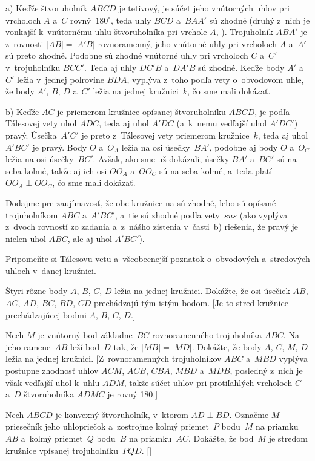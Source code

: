 {%
a)
Keďže štvoruholník $ABCD$ je tetivový, je súčet jeho vnútorných uhlov
pri vrcholoch $A$ a~$C$ rovný~$180^\circ$, teda uhly $BCD$ a~$BAA'$ sú zhodné
(druhý z~nich je vonkajší k~vnútornému uhlu štvoruholníka pri vrchole $A$, \obr).
Trojuholník $ABA'$ je z~rovnosti $|AB|=|A'B|$ rovnoramenný, jeho vnútorné
uhly pri vrcholoch $A$ a~$A'$ sú preto zhodné. Podobne sú zhodné vnútorné
uhly pri vrcholoch $C$ a~$C'$ v~trojuholníku $BCC'$. Teda aj uhly $DC'B$ a~$DA'B$
sú zhodné.
Keďže body $A'$ a~$C'$ ležia v~jednej polrovine $BDA$,
vyplýva z~toho podľa vety o~obvodovom uhle, že body $A'$, $B$, $D$ a~$C'$
ležia na jednej kružnici~$k$, čo sme mali dokázať.
%

b)
Keďže $AC$ je priemerom kružnice opísanej štvoruholníku $ABCD$, je podľa
Tálesovej vety uhol $ADC$, teda aj uhol $A'DC$ (a~k~nemu vedľajší uhol
$A'DC'$) pravý. Úsečka~$A'C'$ je preto z~Tálesovej vety priemerom kružnice~$k$, teda aj uhol $A'BC'$ je pravý. Body $O$ a~$O_A$ ležia na osi úsečky~$BA'$, podobne aj body $O$ a~$O_C$ ležia na osi úsečky~$BC'$. Avšak, ako
sme už dokázali, úsečky $BA'$ a~$BC'$ sú na seba kolmé, takže aj ich osi
$OO_A$ a~$OO_C$ sú na seba kolmé, a~teda platí $OO_A\perp OO_C$, čo sme mali
dokázať.

\poznamka
Dodajme pre zaujímavosť, že obe kružnice na  sú
zhodné, lebo sú opísané trojuholníkom $ABC$ a~$A'BC'$, a~tie sú zhodné
podľa vety~$sus$ (ako vyplýva z~dvoch rovností zo zadania a~z~nášho
zistenia v~časti~b) riešenia, že pravý je nielen uhol $ABC$, ale aj uhol
$A'BC'$).


Pripomeňte si Tálesovu vetu a~všeobecnejší poznatok o~obvodových
a~stredových uhloch v~danej kružnici.

Štyri rôzne body $A$, $B$, $C$, $D$ ležia na jednej kružnici. Dokážte, že
osi úsečiek $AB$, $AC$, $AD$, $BC$, $BD$, $CD$ prechádzajú tým istým bodom. [Je
to stred kružnice prechádzajúcej bodmi $A$, $B$, $C$, $D$.]

Nech $M$ je vnútorný bod základne~$BC$ rovnoramenného trojuholníka $ABC$.
Na jeho ramene~$AB$ leží bod~$D$ tak, že $|MB|=|MD|$. Dokážte, že body
$A$, $C$, $M$, $D$ ležia na jednej kružnici. [Z~rovnoramenných trojuholníkov $ABC$
a~$MBD$ vyplýva postupne zhodnosť uhlov $ACM$, $ACB$, $CBA$, $MBD$
a~$MDB$, posledný z~nich je však vedľajší uhol k~uhlu $ADM$, takže súčet
uhlov pri protiľahlých vrcholoch $C$ a~$D$ štvoruholníka $ADMC$ je rovný
180\st.]

\D
Nech $ABCD$ je konvexný štvoruholník, v~ktorom $AD\perp BD$. Označme $M$
priesečník jeho uhlopriečok a~zostrojme kolmý priemet~$P$ bodu~$M$ na
priamku~$AB$ a~kolmý priemet~$Q$ bodu~$B$ na priamku~$AC$.
Dokážte, že bod~$M$ je stredom kružnice vpísanej trojuholníku~$PQD$. []

}
